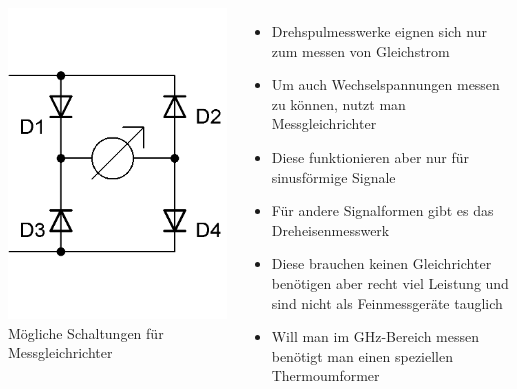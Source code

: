 \begin{frame}
\begin{columns}
\begin{center}
      \includegraphics[width=\textwidth,height=.4\textheight,keepaspectratio]{a16/Messgleichrichter2.png}\\
      {\tiny Mögliche Schaltungen für Messgleichrichter}
    \end{center}
    \begin{itemize}
      \item Drehspulmesswerke eignen sich nur zum messen von Gleichstrom
      \item Um auch Wechselspannungen messen zu können, nutzt man Messgleichrichter
      \item Diese funktionieren aber nur für sinusförmige Signale
      \item Für andere Signalformen gibt es das Dreheisenmesswerk
      \item Diese brauchen keinen Gleichrichter benötigen aber recht viel Leistung und sind nicht als Feinmessgeräte tauglich
      \item Will man im GHz-Bereich messen benötigt man einen speziellen Thermoumformer
    \end{itemize}
  \end{columns}
\end{frame}

